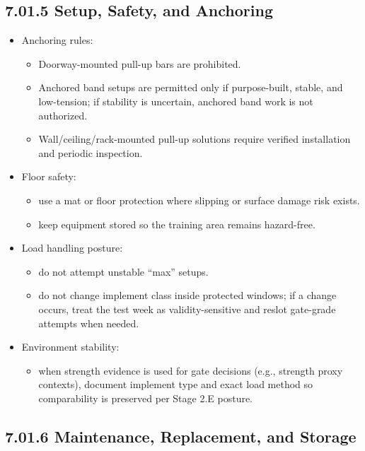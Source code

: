 \documentclass[10pt]{article}
\begin{document}
\subsection*{7.01.5 Setup, Safety, and Anchoring}
{}

\begin{itemize}
\item Anchoring rules:
  \begin{itemize}
  \item Doorway-mounted pull-up bars are prohibited.
  \item Anchored band setups are permitted only if purpose-built, stable, and low-tension; if stability is uncertain, anchored band work is not authorized.
  \item Wall/ceiling/rack-mounted pull-up solutions require verified installation and periodic inspection.
  \end{itemize}
\item Floor safety:
  \begin{itemize}
  \item use a mat or floor protection where slipping or surface damage risk exists.
  \item keep equipment stored so the training area remains hazard-free.
  \end{itemize}
\item Load handling posture:
  \begin{itemize}
  \item do not attempt unstable “max” setups.
  \item do not change implement class inside protected windows; if a change occurs, treat the test week as validity-sensitive and reslot gate-grade attempts when needed.
  \end{itemize}
\item Environment stability:
  \begin{itemize}
  \item when strength evidence is used for gate decisions (e.g., strength proxy contexts), document implement type and exact load method so comparability is preserved per Stage 2.E posture.
  \end{itemize}
\end{itemize}

\subsection*{7.01.6 Maintenance, Replacement, and Storage}
{}
\end{document}

